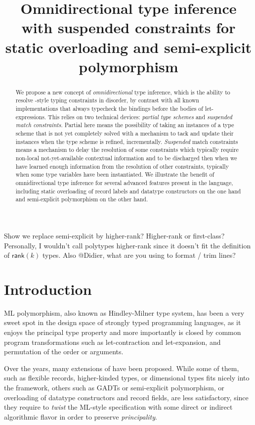 \documentclass[acmsmall,screen,nonacm]{acmart}
\title{Omnidirectional type inference with suspended constraints
   for static overloading and semi-explicit polymorphism}
\begin{document}
\begin{abstract}
We propose a new concept of \emph{omnidirectional} type inference, which is
the ability to resolve \ML-style typing constraints in disorder, by
contrast with all known implementations that always typecheck the
bindings before the bodies of let-expressions.
%
This relies on two technical devices: \emph{partial type schemes}
and \emph{suspended match constraints}. Partial here means  the
possibility of taking an instances of a type scheme that is not yet
completely solved with a mechanism to tack and update their instances when
the type scheme is refined, incrementally.
\emph{Suspended} match constraints means a mechanism to delay the resolution of
some constraints which typically require non-local not-yet-available
contextual information and to be discharged then when we have learned enough
information from the resolution of other constraints, typically when some type
variables have been instantiated.
%
We illustrate the benefit of omnidirectional type inference for several
advanced features present in the \OCaml language, including static
overloading of record labels and datatype constructors on the one hand and
semi-explicit polymorphism on the other hand.
\end{abstract}

\maketitle

\Xdidier
  {Show we replace semi-explicit by higher-rank?}
\Xalistair
  {Higher-rank or first-class? Personally, I wouldn't call polytypes higher-rank since 
   it doesn't fit the definition of $\mathsf{rank}(k)$ types.}
\Xalistair
  {Also @Didier, what are you using to format / trim lines?}

\section{Introduction}

ML polymorphism, also known as Hindley-Milner type system, has been a very
sweet spot in the design space of strongly typed programming languages, as
it enjoys the principal type property and more importantly is closed by
common program transformations such as let-contraction and let-expansion,
and permutation of the order or arguments.

Over the years, many extensions of \ML have been proposed.  While some of
them, such as flexible  records, higher-kinded types, or dimensional types
fits nicely into the \ML framework, others such as GADTs or  semi-explicit
polymorphism, or overloading of datatype constructors and record fields, are
less satisfactory, since they require to \emph{twist} the ML-style
specification with some direct or indirect algorithmic flavor in order to
preserve \emph{principality}.
\end{document}
